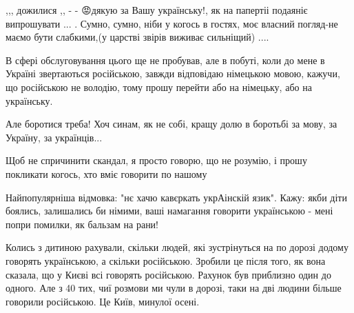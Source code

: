 \begin{itemize}
,,, дожилися ,, - - 😡дякую за Вашу українську!, як на папертіі подаяніє
випрошувати ... . Сумно, сумно, ніби у когось в гостях, моє власний погляд-не
маємо бути слабкими,(у царстві звірів виживає сильніщий) ....


 

В сфері обслуговування цього ще не пробував, але в побуті, коли до мене в
Україні звертаються російською, завжди відповідаю німецькою мовою, кажучи, що
російською не володію, тому прошу перейти або на німецьку, або на українську.


 

Але боротися треба! Хоч синам, як не собі, кращу долю в боротьбі за мову, за
Україну, за українців...


 

Щоб не спричинити скандал, я просто говорю, що не розумію, і прошу покликати
когось, хто вміє говорити по нашому


 

Найпопулярніша відмовка: "нє хачю кавєркать укрАінскій язик". Кажу: якби діти
боялись, залишались би німими, ваші намагання говорити українською - мені попри
помилки, як бальзам на рани! \Smiley[1.0][yellow]

 

Колись з дитиною рахували, скільки людей, які зустрінуться на по дорозі додому
говорять українською, а скільки російською. Зробили це після того, як вона
сказала, що у Києві всі говорять російською. Рахунок був приблизно один до
одного. Але з 40 тих, чиї розмови ми чули в дорозі, таки на дві людини більше
говорили російською. Це Київ, минулої осені.


\end{itemize}
